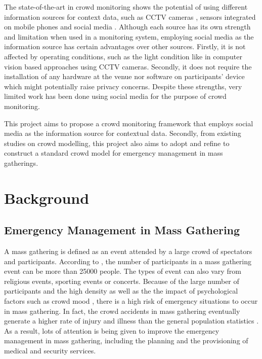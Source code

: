 The state-of-the-art in crowd monitoring shows the potential of using different information sources for context data, such as CCTV cameras \parencite{Davies1995}, sensors integrated on mobile phones \parencite{Wirz2013} and social media \parencite{DelirHaghighi2013}. Although each source has its own strength and limitation when used in a monitoring system, employing social media as the information source has certain advantages over other sources. Firstly, it is not affected by operating conditions, such as the light condition like in computer vision based approaches using CCTV cameras. Secondly, it does not require the installation of any hardware at the venue nor software on participants' device which might potentially raise privacy concerns. Despite these strengths, very limited work has been done using social media for the purpose of crowd monitoring.

This project aims to propose a crowd monitoring framework that employs social media as the information source for contextual data. Secondly, from existing studies on crowd modelling, this project also aims to adopt and refine to construct a standard crowd model for emergency management in mass gatherings.

\section{Background}

\subsection{Emergency Management in Mass Gathering}

A mass gathering is defined as an event attended by a large crowd of spectators and participants. According to \parencite{Arbon2007}, the number of participants in a mass gathering event can be more than 25000 people. The types of event can also vary from religious events, sporting events or concerts. Because of the large number of participants and the high density as well as the the impact of psychological factors such as crowd mood \parencite{Arbon2004}, there is a high risk of emergency situations to occur in mass gathering. In fact, the crowd accidents in mass gathering eventually generate a higher rate of injury and illness than the general population statistics \parencite{Arbon2007}. As a result, lots of attention is being given to improve the emergency management in mass gathering, including the planning and the provisioning of medical and security services. 

